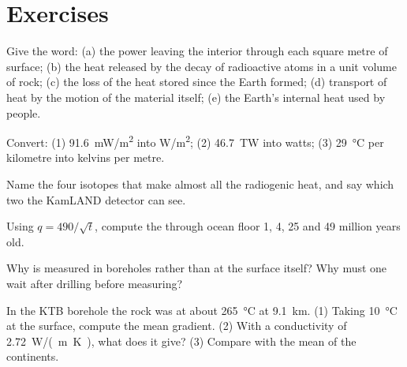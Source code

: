 \section{Exercises}

\begin{exercise}[$\star$]\label{exo:g12:internal-heat:1}
Give the word: (a) the power leaving the interior through each square metre
of surface; (b) the heat released by the decay of radioactive atoms in a unit
volume of rock; (c) the loss of the heat stored since the Earth formed;
(d) transport of heat by the motion of the material itself; (e) the Earth's
internal heat used by people.
\end{exercise}

\begin{exercise}[$\star$]\label{exo:g12:internal-heat:2}
Convert: (1) \qty{91.6}{mW/m^2} into \unit{W/m^2}; (2) \qty{46.7}{TW} into
watts; (3) \qty{29}{\celsius} per kilometre into kelvins per metre.
\end{exercise}

\begin{exercise}[$\star$]\label{exo:g12:internal-heat:3}
Name the four isotopes that make almost all the radiogenic heat, and say
which two the KamLAND detector can see.
\end{exercise}

\begin{exercise}[$\star$]\label{exo:g12:internal-heat:4}
Using $q = 490/\sqrt{t}$, compute the  through ocean floor 1, 4,
25 and 49 million years old.
\end{exercise}

\begin{exercise}[$\star$]\label{exo:g12:internal-heat:5}
Why is  measured in boreholes rather than at the surface itself?
Why must one wait after drilling before measuring?
\end{exercise}

\begin{exercise}[$\star\star$]\label{exo:g12:internal-heat:6}
In the KTB borehole the rock was at about \qty{265}{\celsius} at
\qty{9.1}{km}. (1) Taking \qty{10}{\celsius} at the surface, compute the mean
gradient. (2) With a conductivity of \qty{2.72}{W/(m.K)}, what 
does it give? (3) Compare with the mean of the continents.
\end{exercise}

